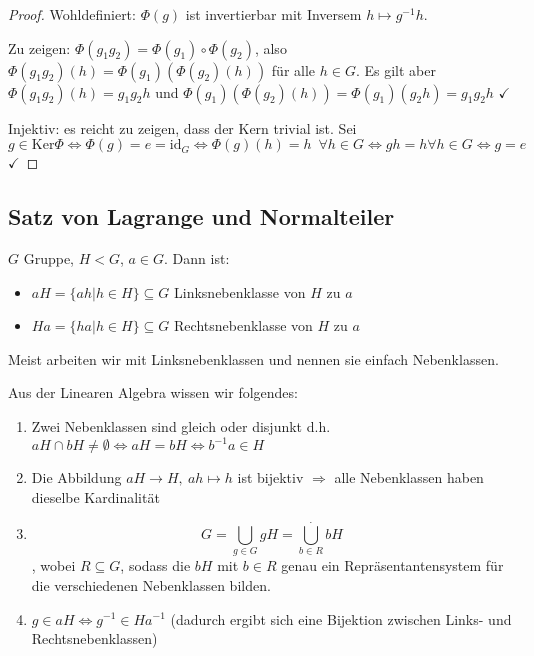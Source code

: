 \documentclass[12pt,a4paper]{scrartcl}
\begin{document}
\begin{proof}
	\leavevmode
	
	Wohldefiniert: $\Phi(g)$ ist invertierbar mit Inversem $h\mapsto g^{-1}h$.
	
	Zu zeigen: $\Phi(g_1g_2) = \Phi(g_1)\circ \Phi(g_2)$, also $\Phi(g_1g_2)(h) = \Phi(g_1)(\Phi(g_2)(h))$ für alle $h\in G$. Es gilt aber $\Phi(g_1g_2)(h) = g_1g_2h$ und $\Phi(g_1)(\Phi(g_2)(h)) = \Phi(g_1)(g_2h) = g_1g_2h$ \hfill$\checkmark$
	
	Injektiv: es reicht zu zeigen, dass der Kern trivial ist. Sei $g\in \text{Ker}\Phi\Leftrightarrow \Phi(g) = e = \text{id}_G \Leftrightarrow \Phi(g)(h)= h\enspace \forall h\in G\Leftrightarrow gh = h\forall h\in G\Leftrightarrow g= e$\hfill $\checkmark$
\end{proof}


\subsection{Satz von Lagrange und Normalteiler}
\begin{defi}
	$G$ Gruppe, $H<G$, $a\in G$. Dann ist:
	\begin{itemize}
		\item[] $aH = \{ah|h\in H\}\subseteq G$ Linksnebenklasse von $H$ zu $a$
		\item[] $Ha = \{ha|h\in H\}\subseteq G$ Rechtsnebenklasse von $H$ zu $a$
	\end{itemize}
	Meist arbeiten wir mit Linksnebenklassen und nennen sie einfach Nebenklassen.
\end{defi}

\noindent
Aus der Linearen Algebra wissen wir folgendes: \begin{enumerate}
	\item Zwei Nebenklassen sind gleich oder disjunkt d.h. $aH\cap bH \neq \emptyset \Leftrightarrow aH = bH\Leftrightarrow b^{-1}a \in H$
	\item Die Abbildung $aH\to H,\ ah\mapsto h$ ist bijektiv $\Rightarrow$ alle Nebenklassen haben dieselbe Kardinalität
	\item $$ G = \bigcup\limits_{g\in G}gH = \overset{.}{\bigcup\limits_{b\in R} }bH$$, wobei $R\subseteq G$, sodass die $bH$ mit $b\in R$ genau ein Repräsentantensystem für die verschiedenen Nebenklassen bilden.
	\item $g\in aH\Leftrightarrow g^{-1}\in Ha^{-1}$ (dadurch ergibt sich eine Bijektion zwischen Links- und Rechtsnebenklassen)
	
\end{enumerate}
\end{document}
